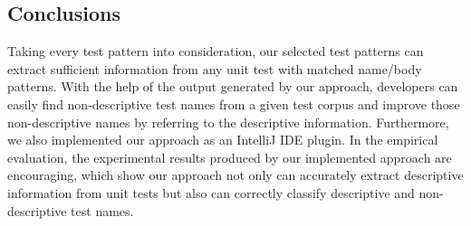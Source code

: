 \documentclass[proposal.tex]{subfiles}
\begin{document}
\subsection{Conclusions}

Taking every test pattern into consideration, our selected test patterns can extract sufficient information from any unit test with matched name\slash body patterns.
%
With the help of the output generated by our approach, developers can easily find non-descriptive test names from a given test corpus and improve those non-descriptive names by referring to the descriptive information.
%
Furthermore, we also implemented our approach as an IntelliJ IDE plugin.
%
In the empirical evaluation, the experimental results produced by our implemented approach are encouraging, which show our approach not only can accurately extract descriptive information from unit tests but also can correctly classify descriptive and non-descriptive test names.
\end{document}
